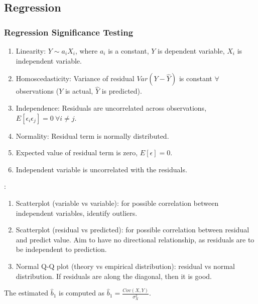 \subsection{Regression}

\subsubsection{Regression Significance Testing}

\begin{definition} 
\begin{enumerate}[label=\roman*.]
\setlength{\itemsep}{0pt}
\item Linearity: $Y \sim a_i X_i$, where $a_i$ is a constant, $Y$ is dependent variable, $X_i$ is independent variable.
\item Homoscedasticity: Variance of residual $Var(Y - \hat{Y})$ is constant $\forall$ observations ($Y$ is actual, $\hat{Y}$ is predicted).
\item Independence: Residuals are uncorrelated across observations, $E[\epsilon_i \epsilon_j] = 0 \ \forall i \neq j$.
\item Normality: Residual term is normally distributed. 
\item Expected value of residual term is zero, $E[\epsilon] = 0$.
\item Independent variable is uncorrelated with the residuals.
\end{enumerate}
\end{definition}

\begin{definition} :
\begin{enumerate}[label=\roman*.]
\setlength{\itemsep}{0pt}
\item Scatterplot (variable vs variable): for possible correlation between independent variables, identify outliers.
\item Scatterplot (residual vs predicted): for possible correlation between residual and predict value. Aim to have no directional relationship, as residuals are to be independent to prediction.
\item Normal Q-Q plot (theory vs empirical distribution): residual vs normal distribution. If residuals are along the diagonal, then it is good.
\end{enumerate}
\end{definition}

\begin{definition} The estimated  $\hat{b}_1$ is computed as $\hat{b}_1 = \frac{Cov(X,Y)}{\sigma_X^2}$.
\end{definition}

